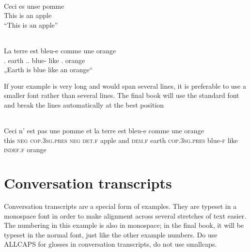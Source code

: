 \ea\label{ex:key:} 

\\
\gll Ceci es unse pomme\\
     This is an apple\\
\glt “This is an apple”
\z

\ea\label{ex:key:}
 \\
\gll La       terre  est                    bleu-e  comme  une      orange\\
     . earth ..    blue-   like       . orange\\
\glt „Earth is blue like an orange“
\z

If your example is very long and would span several lines, it is preferable to use a smaller font rather than several lines. The final book will use the standard font and break the lines automatically at the best position

\ea\label{ex:key:}
\\
\gll Ceci n'    est                   pas   une   pomme et    la       terre  est                  bleu-e  comme une      orange\\
     {this} {\textsc{neg cop}}{.3}{\textsc{sg.pres}}{} {\textsc{neg det.f}}{  apple    and} {\textsc{dem.f}}{ earth}{ \textsc{cop.3sg.pres}}{  blue-}{\textsc{f} }{like} {\textsc{indef.f} }{orange}\\
\section{Conversation transcripts}

Conversation transcripts are a special form of examples. They are typeset in a monospace font in order to make alignment across several stretches of text easier.   The numbering in this example is also in monospace; in the final book, it will be typeset in the normal font, just like the other example numbers. Do use ALLCAPS for glosses in conversation transcripts, do not use smallcaps.

